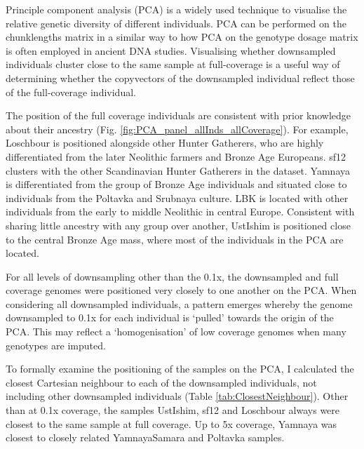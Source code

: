 {Principle component analysis (PCA) is a widely used technique to visualise the relative genetic diversity of different individuals. PCA can be performed on the chunklengths matrix in a similar way to how PCA on the genotype dosage matrix is often employed in ancient DNA studies. Visualising whether downsampled individuals cluster close to the same sample at full-coverage is a useful way of determining whether the copyvectors of the downsampled individual reflect those of the full-coverage individual.

The position of the full coverage individuals are consistent with prior knowledge about their ancestry (Fig. \ref{fig:PCA_panel_allInds_allCoverage}). For example, Loschbour is positioned alongside other Hunter Gatherers, who are highly differentiated from the later Neolithic farmers and Bronze Age Europeans. sf12 clusters with the other Scandinavian Hunter Gatherers in the dataset. Yamnaya is differentiated from the group of Bronze Age individuals and situated close to individuals from the Poltavka and Srubnaya culture. LBK is located with other individuals from the early to middle Neolithic in central Europe. Consistent with sharing little ancestry with any group over another, UstIshim is positioned close to the central Bronze Age mass, where most of the individuals in the PCA are located. 

For all levels of downsampling other than the 0.1x, the downsampled and full coverage genomes were positioned very closely to one another on the PCA. When considering all downsampled individuals, a pattern emerges whereby the genome downsampled to 0.1x for each individual is `pulled' towards the origin of the PCA. This may reflect a `homogenisation' of low coverage genomes when many genotypes are imputed.

To formally examine the positioning of the samples on the PCA, I calculated the closest Cartesian neighbour to each of the downsampled individuals, not including other downsampled individuals (Table \ref{tab:ClosestNeighbour}). Other than at 0.1x coverage, the samples UstIshim, sf12 and Loschbour always were closest to the same sample at full coverage. Up to 5x coverage, Yamnaya was closest to closely related YamnayaSamara and Poltavka samples. 


}
